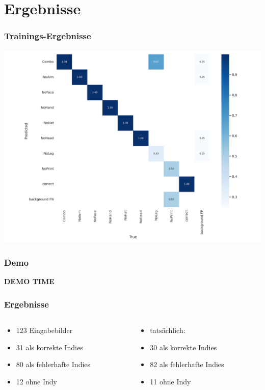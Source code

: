 \documentclass[ignorenonframetext,naustrian,12pt,t]{beamer}
\begin{document}
\section{Ergebnisse}
\begin{frame}
	\frametitle{Trainings-Ergebnisse}
		\centering
		\includegraphics[height=.9\textheight]{../sModel/confusion_matrixV3.png}
\end{frame}

\begin{frame}
	\frametitle{Demo}
		\centering 
		\Huge \textbf{DEMO TIME} \\
\end{frame}

\begin{frame}
	\frametitle{Ergebnisse}
		\centering
	\begin{columns}
     \begin{column}{0.5\textwidth}
		\begin{itemize}[label={\color{myTitleColour}\textbullet}]
		\item 123 Eingabebilder
		\item 31 als korrekte Indies 
		\item 80 als fehlerhafte Indies 
		\item 12 ohne Indy
		\end{itemize}
     \end{column}
     \begin{column}{0.49\textwidth}
		\begin{itemize}[label={\color{myTitleColour}\textbullet}]
		\item tatsächlich:
		\item 30 als korrekte Indies 
		\item 82 als fehlerhafte Indies 
		\item 11 ohne Indy
		\end{itemize}

      \end{column}
	\end{columns}
\end{frame}
\end{document}
